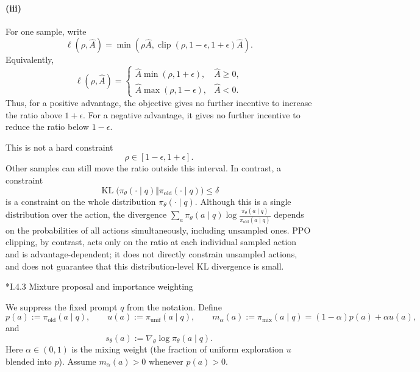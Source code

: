 \documentclass[11pt]{article}
\makeatletter
\let\origsubsec\subsection
\renewcommand{\subsection}{\@ifstar{\tx@subsec}{\origsubsec}}
\newcommand{\tx@subsec}[1]{\phantomsection\origsubsec*{#1}\addcontentsline{toc}{subsubsection}{#1}}
\makeatother
\begin{document}
\paragraph{(iii)}
For one sample, write
\[
\ell(\rho,\hat A)
=
\min\left(
\rho\hat A,
\operatorname{clip}(\rho,1-\epsilon,1+\epsilon)\hat A
\right).
\]
Equivalently,
\[
\ell(\rho,\hat A)
=
\begin{cases}
\hat A\min(\rho,1+\epsilon), & \hat A\geq 0,\\[2mm]
\hat A\max(\rho,1-\epsilon), & \hat A<0.
\end{cases}
\]
Thus, for a positive advantage, the objective gives no further incentive to
increase the ratio above $1+\epsilon$. For a negative advantage, it gives no
further incentive to reduce the ratio below $1-\epsilon$.

This is not a hard constraint
\[
\rho\in[1-\epsilon,1+\epsilon].
\]
Other samples can still move the ratio outside this interval. In contrast, a
constraint
\[
\operatorname{KL}
\bigl(
\pi_\theta(\cdot\mid q)
\Vert
\pi_{\mathrm{old}}(\cdot\mid q)
\bigr)
\leq\delta
\]
is a constraint on the whole distribution $\pi_\theta(\cdot\mid q)$. Although this
is a single distribution over the action, the divergence
$\sum_a\pi_\theta(a\mid q)\log\frac{\pi_\theta(a\mid q)}{\pi_{\mathrm{old}}(a\mid q)}$
depends on the probabilities of all actions simultaneously, including unsampled
ones. PPO clipping, by contrast, acts only on the ratio at each individual
sampled action and is advantage-dependent; it does not directly constrain
unsampled actions, and does not guarantee that this distribution-level KL
divergence is small.


\subsection*{I.4.3 Mixture proposal and importance weighting}

We suppress the fixed prompt $q$ from the notation. Define
\[
    p(a) := \pi_{\mathrm{old}}(a\mid q),
    \qquad
    u(a) := \pi_{\mathrm{unif}}(a\mid q),
    \qquad
    m_\alpha(a) := \pi_{\mathrm{mix}}(a\mid q)
    = (1-\alpha)p(a)+\alpha u(a),
\]
and
\[
    s_\theta(a):=\nabla_\theta \log \pi_\theta(a\mid q).
\]
Here $\alpha\in(0,1)$ is the mixing weight (the fraction of uniform exploration $u$ blended into $p$). Assume $m_\alpha(a)>0$ whenever $p(a)>0$.
\end{document}
